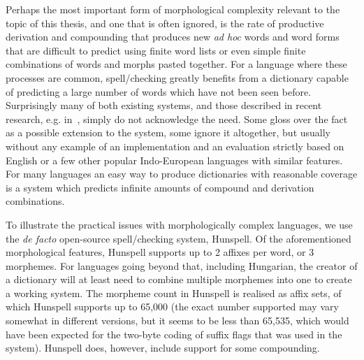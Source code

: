 \documentclass[officiallayout,final]{unihelcompling}
\begin{document}
Perhaps the most important form of morphological complexity relevant to the
topic of this thesis, and one that is often ignored, is the rate of productive
derivation and compounding that produces new \emph{ad hoc} words and word forms
that are difficult to predict using finite word lists or even simple finite
combinations of words and morphs pasted together.  For a language where these
processes are common, spell\-/checking greatly benefits from a dictionary
capable of predicting a large number of words which have not been seen before.
Surprisingly many of both existing systems, and those described in recent
research, e.g.  in~\cite{hassan2008language,watson2003new}, simply do not
acknowledge the need.  Some gloss over the fact as a possible extension to the
system, some ignore it altogether, but usually without any example of an
implementation and an evaluation strictly based on English or a few other
popular Indo-European languages with similar features. For many languages an
easy way to produce dictionaries with reasonable coverage is a system which
predicts infinite amounts of compound and derivation combinations.

To illustrate the practical issues with morphologically complex languages, we
use the \emph{de facto} open-source spell\-/checking system, Hunspell. Of the
aforementioned morphological features, Hunspell supports up to 2 affixes per
word, or 3 morphemes. For languages going beyond that, including Hungarian, the
creator of a dictionary will at least need to combine multiple morphemes into
one to create a working system. The morpheme count in Hunspell is realised as
affix sets, of which Hunspell supports up to 65,000 (the exact number supported
may vary somewhat in different versions, but it seems to be less than 65,535,
which would have been expected for the two-byte coding of suffix flags that was
used in the system). Hunspell does, however, include support for some
compounding.
\end{document}
